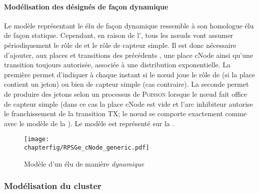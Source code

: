             \paragraph{Modélisation des \cns désignés de façon dynamique}
Le modèle \rpsge représentant le \cn élu de façon dynamique ressemble à son homologue élu de façon statique.
Cependant, en raison de l'\elecdyn, tous les nœuds vont assumer périodiquement le rôle de \cn et le rôle de capteur simple.
Il est donc nécessaire d'ajouter, aux places et transitions des précédents \cns, une place \textsf{cNode} ainsi qu'une transition toujours autorisée, associée à une distribution exponentielle.
La première permet d'indiquer à chaque instant si le nœud joue le rôle de \cn (si la place contient un jeton) ou bien de capteur simple (cas contraire).
La seconde permet de produire des jetons selon un processus de \textsc{Poisson} lorsque le nœud fait office de capteur simple (dans ce cas la place \textsf{cNode} est vide et l'arc inhibiteur autorise le franchissement de la transition \textsf{TX}; le nœud se comporte exactement comme avec le modèle de la ).
Le modèle est représenté sur la .
\begin{figure}[!ht]
    \centering
    \texttt{[image: \\chapterfig/RPSGe\_cNode\_generic.pdf]}
    \caption{Modèle \rpsge d'un \cn élu de manière \emph{dynamique}}\label{sa:fig:cnodegspn2}
\end{figure}

        \subsubsection{Modélisation du cluster}

